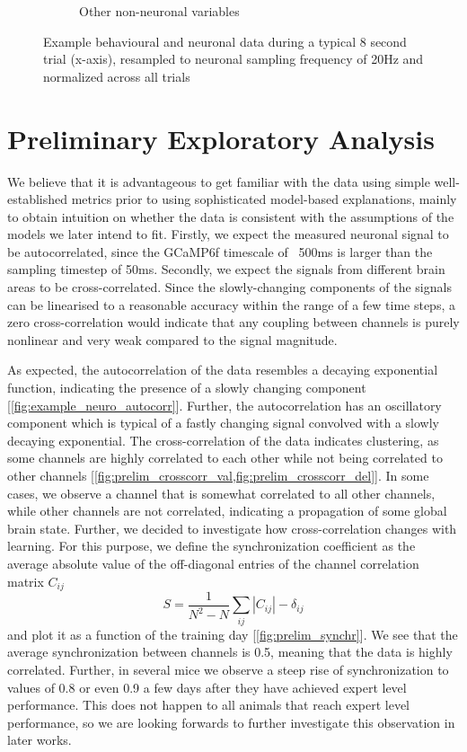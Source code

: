 \documentclass[a4paper,10pt]{article}
\begin{document}
\begin{figure}
\begin{subfigure}[b]{0.4\textwidth}
        \caption{Other non-neuronal variables}
        \label{fig:example_behav_signal}
    \end{subfigure}
    \caption{Example behavioural and neuronal data during a typical 8 second trial (x-axis), resampled to neuronal sampling frequency of 20Hz and normalized across all trials}\label{fig:example_behavioural_neural_data}
\end{figure}

\section{Preliminary Exploratory Analysis}
We believe that it is advantageous to get familiar with the data using simple well-established metrics prior to using sophisticated model-based explanations, mainly to obtain intuition on whether the data is consistent with the assumptions of the models we later intend to fit. Firstly, we expect the measured neuronal signal to be autocorrelated, since the GCaMP6f timescale of ~500ms is larger than the sampling timestep of 50ms. Secondly, we expect the signals from different brain areas to be cross-correlated. Since the slowly-changing components of the signals can be linearised to a reasonable accuracy within the range of a few time steps, a zero cross-correlation would indicate that any coupling between channels is purely nonlinear and very weak compared to the signal magnitude.

As expected, the autocorrelation of the data resembles a decaying exponential function, indicating the presence of a slowly changing component [\cref{fig:example_neuro_autocorr}]. Further, the autocorrelation has an oscillatory component which is typical of a fastly changing signal convolved with a slowly decaying exponential. The cross-correlation of the data indicates clustering, as some channels are highly correlated to each other while not being correlated to other channels [\cref{fig:prelim_crosscorr_val,fig:prelim_crosscorr_del}]. In some cases, we observe a channel that is somewhat correlated to all other channels, while other channels are not correlated, indicating a propagation of some global brain state. Further, we decided to investigate how cross-correlation changes with learning. For this purpose, we define the synchronization coefficient as the average absolute value of the off-diagonal entries of the channel correlation matrix $C_{ij}$
\begin{equation}
  S = \frac{1}{N^2 - N}\sum_{ij} |C_{ij}| - \delta_{ij}
\end{equation}
and plot it as a function of the training day [\cref{fig:prelim_synchr}]. We see that the average synchronization between channels is 0.5, meaning that the data is highly correlated. Further, in several mice we observe a steep rise of synchronization to values of 0.8 or even 0.9 a few days after they have achieved expert level performance. This does not happen to all animals that reach expert level performance, so we are looking forwards to further investigate this observation in later works.
\end{document}
